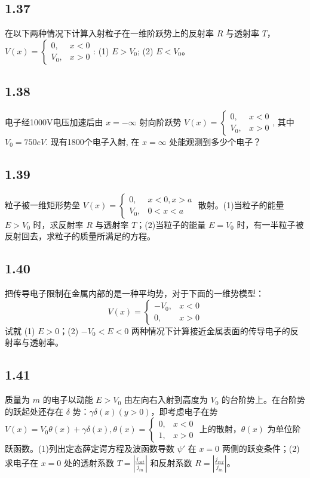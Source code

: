 \subsection{1.37}
在以下两种情况下计算入射粒子在一维阶跃势上的反射率 $R$ 与透射率 $T$，$V(x) = \begin{cases} 
0, & x < 0 \\ 
V_0, & x > 0 
\end{cases}$: (1) $E > V_0$; (2) $E < V_0$。

\subsection{1.38}
电子经1000V电压加速后由 $x = -\infty$ 射向阶跃势 $V(x) = \begin{cases}
0, & x < 0 \\
V_0, & x > 0 
\end{cases}$, 其中 $V_0 = 750eV$. 现有1800个电子入射, 在 $x = \infty$ 处能观测到多少个电子？

\subsection{1.39}
粒子被一维矩形势垒 $V(x) = \begin{cases}
0, & x<0, x>a \\
V_0, & 0<x<a
\end{cases}$ 散射。(1)当粒子的能量 $E > V_0$ 时，求反射率 $R$ 与透射率 $T$；(2)当粒子的能量 $E = V_0$ 时，有一半粒子被反射回去，求粒子的质量所满足的方程。

\subsection{1.40}
把传导电子限制在金属内部的是一种平均势，对于下面的一维势模型：
$$V(x) = 
\begin{cases} 
-V_0, & x < 0 \\ 
0, & x > 0 
\end{cases}$$
试就 (1) $E > 0$；(2) $-V_0 < E < 0$ 两种情况下计算接近金属表面的传导电子的反射率与透射率。

\subsection{1.41}
质量为 $m$ 的电子以动能 $E > V_0$ 由左向右入射到高度为 $V_0$ 的台阶势上。在台阶势的跃起处还存在 $\delta$ 势：$\gamma \delta(x)(y > 0)$，即考虑电子在势 $V(x) = V_0 \theta(x) + \gamma \delta(x), \theta(x) = \begin{cases}
0, & x < 0 \\
1, & x > 0
\end{cases}$ 上的散射，$\theta(x)$ 为单位阶跃函数。(1)列出定态薛定谔方程及波函数导数 $\psi'$ 在 $x = 0$ 两侧的跃变条件；(2)求电子在 $x = 0$ 处的透射系数 $T = \left| \frac{j_{out}}{j_{in}} \right|$ 和反射系数 $R = \left| \frac{j_{ref}}{j_{in}} \right|$。

